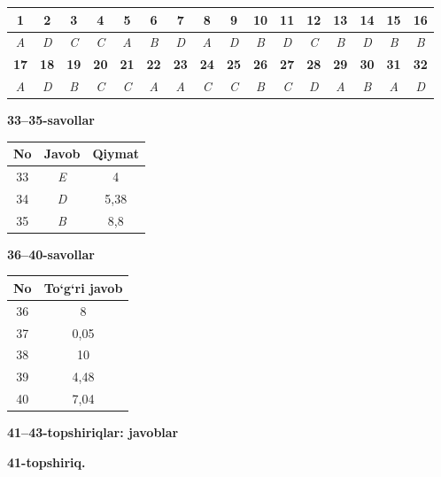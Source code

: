 \documentclass[11pt,a4paper]{article}
\begin{document}
\noindent\begin{tabular}{|c|c|c|c|c|c|c|c|c|c|c|c|c|c|c|c|}\hline
\textbf{1} & \textbf{2} & \textbf{3} & \textbf{4} & \textbf{5} & \textbf{6} & \textbf{7} & \textbf{8} & \textbf{9} & \textbf{10} & \textbf{11} & \textbf{12} & \textbf{13} & \textbf{14} & \textbf{15} & \textbf{16}\\\hline
\textsl{A} & \textsl{D} & \textsl{C} & \textsl{C} & \textsl{A} & \textsl{B} & \textsl{D} & \textsl{A} & \textsl{D} & \textsl{B} & \textsl{D} & \textsl{C} & \textsl{B} & \textsl{D} & \textsl{B} & \textsl{B}\\\hline
\textbf{17} & \textbf{18} & \textbf{19} & \textbf{20} & \textbf{21} & \textbf{22} & \textbf{23} & \textbf{24} & \textbf{25} & \textbf{26} & \textbf{27} & \textbf{28} & \textbf{29} & \textbf{30} & \textbf{31} & \textbf{32}\\\hline
\textsl{A} & \textsl{D} & \textsl{B} & \textsl{C} & \textsl{C} & \textsl{A} & \textsl{A} & \textsl{C} & \textsl{C} & \textsl{B} & \textsl{C} & \textsl{D} & \textsl{A} & \textsl{B} & \textsl{A} & \textsl{D}\\\hline
\end{tabular}\par\medskip
\noindent\textbf{33--35-savollar}\par\smallskip
\noindent\begin{tabular}{|c|c|c|}\hline \textbf{No} & \textbf{Javob} & \textbf{Qiymat}\\\hline
33 & \textsl{E} & 4\\\hline
34 & \textsl{D} & 5,38\\\hline
35 & \textsl{B} & 8,8\\\hline
\end{tabular}\par\medskip
\noindent\textbf{36--40-savollar}\par\smallskip
\noindent\begin{tabular}{|c|c|}\hline \textbf{No} & \textbf{To`g`ri javob}\\\hline
36 & 8\\\hline
37 & 0,05\\\hline
38 & 10\\\hline
39 & 4,48\\\hline
40 & 7,04\\\hline
\end{tabular}\par\medskip
\noindent\textbf{41--43-topshiriqlar: javoblar}\par\smallskip
\noindent\textbf{41-topshiriq.}\par
\end{document}
